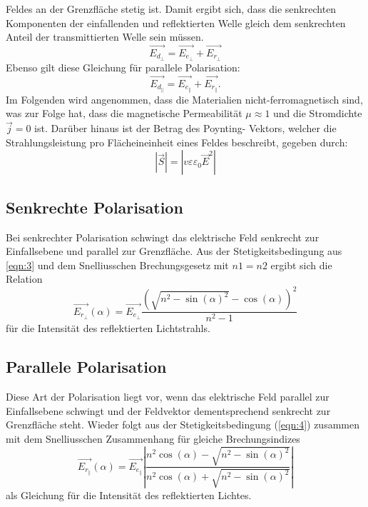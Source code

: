 Feldes an der Grenzfläche stetig ist. Damit ergibt sich, dass die senkrechten 
Komponenten der einfallenden und reflektierten Welle gleich dem senkrechten 
Anteil der transmittierten Welle sein müssen.
\begin{equation}
    \label{eqn:3}
    \vec{E_{d_\perp}} = \vec{E_{e_\perp}} + \vec{E_{r_\perp}}
\end{equation}
Ebenso gilt diese Gleichung für parallele Polarisation:
\begin{equation}
    \label{eqn:4}
    \vec{E_{d_\parallel}} = \vec{E_{e_\parallel}} + \vec{E_{r_\parallel}}.
\end{equation}
Im Folgenden wird angenommen, dass die Materialien nicht-ferromagnetisch
sind, was zur Folge hat, dass die magnetische Permeabilität $\mu \approx 1$ und 
die Stromdichte $\vec{j}=0$ ist. Darüber hinaus ist der Betrag des Poynting-
Vektors, welcher die Strahlungsleistung pro Flächeineinheit eines Feldes beschreibt, 
gegeben durch:
\begin{equation}
    \label{eqn:5}
    |\vec{S}| = |v \varepsilon \varepsilon_0 \vec{E}^2|
\end{equation}

\subsection{Senkrechte Polarisation}
\label{subsec:senk}
Bei senkrechter Polarisation schwingt das elektrische Feld senkrecht zur 
Einfallsebene und parallel zur Grenzfläche.
Aus der Stetigkeitsbedingung aus \autoref{eqn:3} und dem Snelliusschen Brechungsgesetz 
mit $n1=n2$ ergibt sich die Relation 
\begin{equation}
    \label{eqn:6}
    \vec{E_{r_\perp}}(\alpha) = \vec{E_{e_\perp}} \frac{(\sqrt{n^2-\sin(\alpha)^2} - 
    \cos(\alpha))^2}{n^2 - 1}
\end{equation}
für die Intensität des reflektierten Lichtstrahls.

\subsection{Parallele Polarisation}
\label{subsec:para}
Diese Art der Polarisation liegt vor, wenn das elektrische Feld parallel zur 
Einfallsebene schwingt und der Feldvektor dementsprechend senkrecht zur Grenzfläche 
steht. Wieder folgt aus der Stetigkeitsbedingung (\autoref{eqn:4}) zusammen mit 
dem Snelliusschen Zusammenhang für gleiche Brechungsindizes
\begin{equation}
    \vec{E_{r_\parallel}}(\alpha) = \vec{E_{e_\parallel}} 
    \left|\frac{n^2 \cos(\alpha) - \sqrt{n^2-\sin(\alpha)^2}}
    {n^2 \cos(\alpha) + \sqrt{n^2-\sin(\alpha)^2}}  \right|
\end{equation}
als Gleichung für die Intensität des reflektierten Lichtes.

